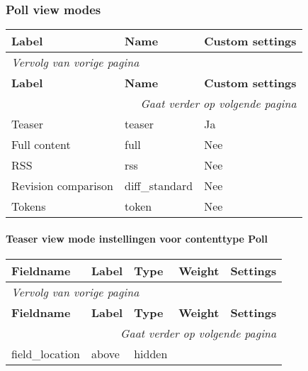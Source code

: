 \subsubsection{Poll view modes}
  \begin{longtable}{| p{5.00cm}|p{5.00cm}|p{5.00cm}|}
  \hline
  \rowcolor{tableheader}
  \textbf{Label} & \textbf{Name} & \textbf{Custom settings}  \tabularnewline
  \hline
\endfirsthead
\multicolumn{3}{l}{\textit{Vervolg van vorige pagina}} \\
\hline
\rowcolor{tableheader}
  \textbf{Label} & \textbf{Name} & \textbf{Custom settings}  \tabularnewline
  \hline
\hline
\endhead
\multicolumn{3}{r}{\textit{Gaat verder op volgende pagina}} \\
\endfoot
\hline
\endlastfoot
  Teaser & teaser & Ja  \tabularnewline
  \hline
  Full content & full & Nee  \tabularnewline
  \hline
  RSS & rss & Nee  \tabularnewline
  \hline
  Revision comparison & diff\_standard & Nee  \tabularnewline
  \hline
  Tokens & token & Nee  \tabularnewline
  \hline
  \end{longtable}

\paragraph{Teaser view mode instellingen voor contenttype Poll }

  \begin{longtable}{| p{3.00cm}|p{3.00cm}|p{3.00cm}|p{3.00cm}|p{3.00cm}|}
  \hline
  \rowcolor{tableheader}
  \textbf{Fieldname} & \textbf{Label} & \textbf{Type} & \textbf{Weight} & \textbf{Settings}  \tabularnewline
  \hline
\endfirsthead
\multicolumn{5}{l}{\textit{Vervolg van vorige pagina}} \\
\hline
\rowcolor{tableheader}
  \textbf{Fieldname} & \textbf{Label} & \textbf{Type} & \textbf{Weight} & \textbf{Settings}  \tabularnewline
  \hline
\hline
\endhead
\multicolumn{5}{r}{\textit{Gaat verder op volgende pagina}} \\
\endfoot
\hline
\endlastfoot
  field\_location & above & hidden &   &    \tabularnewline
  \hline
  \end{longtable}

